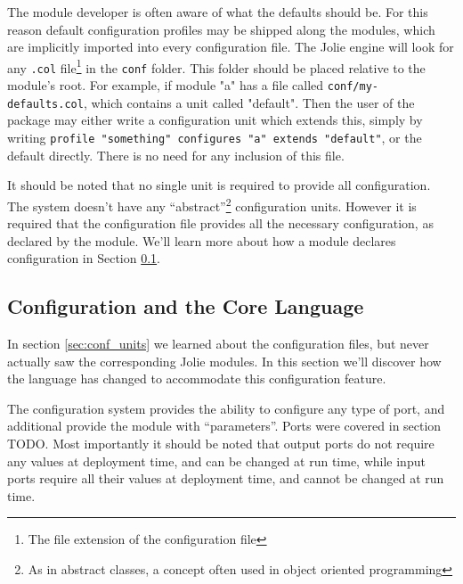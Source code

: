 The module developer is often aware of what the defaults should be. For this
reason default configuration profiles may be shipped along the modules, which
are implicitly imported into every configuration file. The Jolie engine will
look for any \texttt{.col} file\footnote{The file extension of the
configuration file} in the \texttt{conf} folder. This folder
should be placed relative to the module's root. For example, if module "a" has
a file called \texttt{conf/my-defaults.col}, which contains a unit
called "default". Then the user of the package may either write a configuration
unit which extends this, simply by writing \texttt{profile
"something" configures "a" extends "default"}, or the default
directly. There is no need for any inclusion of this file.

It should be noted that no single unit is required to provide all
configuration. The system doesn't have any ``abstract''\footnote{As in abstract
classes, a concept often used in object oriented programming} configuration
units. However it is required that the configuration file provides all the
necessary configuration, as declared by the module. We'll learn more about
how a module declares configuration in Section \ref{sec:ol_conf}.

\subsection{Configuration and the Core Language}
\label{sec:ol_conf}

In section \ref{sec:conf_units} we learned about the configuration files, but
never actually saw the corresponding Jolie modules. In this section we'll
discover how the language has changed to accommodate this configuration
feature.

The configuration system provides the ability to configure any type of port,
and additional provide the module with ``parameters''. Ports were covered in
section TODO. Most importantly it should be noted that output ports do not
require any values at deployment time, and can be changed at run time, while
input ports require all their values at deployment time, and cannot be changed
at run time. %

